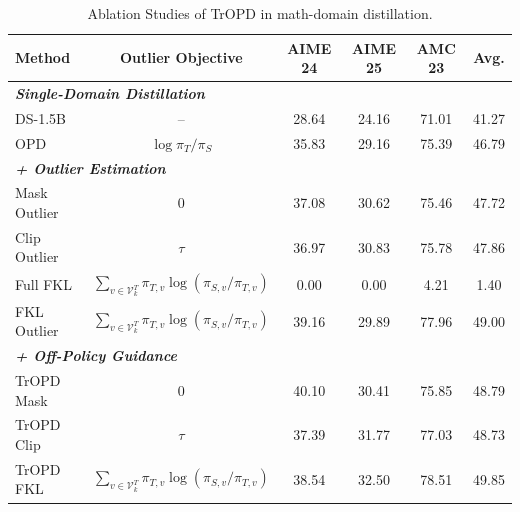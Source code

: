 \documentclass{article} %
\begin{document}
\begin{table}[t]
\centering
\small
\setlength{\tabcolsep}{6pt}
\renewcommand{\arraystretch}{1.1}
\begin{tabular}{lccccc}
\toprule
Method & Outlier Objective & AIME 24 & AIME 25 & AMC 23 & Avg. \\
\midrule
\multicolumn{3}{l}{\emph{\quad \textbf{Single-Domain Distillation}}} \\
DS-1.5B            & -- & 28.64 & 24.16 & 71.01 & 41.27 \\
OPD                & $\log \pi_{T}/\pi_{S}$
                   & 35.83 & 29.16 & 75.39 & 46.79 \\
\midrule
\multicolumn{3}{l}{\emph{\quad \textbf{+ Outlier Estimation}}} \\ 
Mask Outlier       & 0  & 37.08 & 30.62 & 75.46 & 47.72 \\
Clip Outlier       & $\tau$ & 36.97 & 30.83 & 75.78 & 47.86 \\
Full FKL           & $\sum_{v \in \mathcal{V}^{T}_{k}} \pi_{T,v} \log (\pi_{S,v}/\pi_{T,v})$ 
                   & 0.00  & 0.00  & 4.21  & 1.40  \\
\rowcolor{lightpurple} FKL Outlier 
                   & $\sum_{v \in \mathcal{V}^{T}_{k}} \pi_{T,v} \log (\pi_{S,v}/\pi_{T,v})$ 
                   & 39.16 & 29.89 & 77.96 & 49.00 \\
\midrule
\multicolumn{3}{l}{\emph{\quad \textbf{+ Off-Policy Guidance}}} \\ 
TrOPD Mask         & 0 & 40.10 & 30.41 & 75.85 & 48.79 \\
TrOPD Clip         & $\tau$ & 37.39 & 31.77 & 77.03 & 48.73 \\
\rowcolor{lightpurple} TrOPD FKL 
                   & $\sum_{v \in \mathcal{V}^{T}_{k}} \pi_{T,v} \log (\pi_{S,v}/\pi_{T,v})$ 
                   & 38.54 & 32.50 & 78.51 & 49.85 \\
\bottomrule
\end{tabular}%
\caption{Ablation Studies of TrOPD in math-domain distillation.}
\vskip -0.1in 
\label{tab:ablation}
\end{table}
\end{document}
